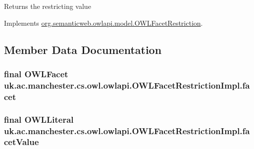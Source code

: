 \begin{DoxyReturn}{Returns}
the restricting value 
\end{DoxyReturn}


Implements \hyperlink{interfaceorg_1_1semanticweb_1_1owlapi_1_1model_1_1_o_w_l_facet_restriction_ac1eeeb10d66d4d21784a8985ec5908d9}{org.\-semanticweb.\-owlapi.\-model.\-O\-W\-L\-Facet\-Restriction}.



\subsection{Member Data Documentation}
\hypertarget{classuk_1_1ac_1_1manchester_1_1cs_1_1owl_1_1owlapi_1_1_o_w_l_facet_restriction_impl_a43b4dbe8b964fd6287e66fcb121da81c}{
\subsubsection[{facet}]{\setlength{\rightskip}{0pt plus 5cm}final {\bf O\-W\-L\-Facet} uk.\-ac.\-manchester.\-cs.\-owl.\-owlapi.\-O\-W\-L\-Facet\-Restriction\-Impl.\-facet\hspace{0.3cm}{\ttfamily [private]}}}\label{classuk_1_1ac_1_1manchester_1_1cs_1_1owl_1_1owlapi_1_1_o_w_l_facet_restriction_impl_a43b4dbe8b964fd6287e66fcb121da81c}
\hypertarget{classuk_1_1ac_1_1manchester_1_1cs_1_1owl_1_1owlapi_1_1_o_w_l_facet_restriction_impl_afebbfcf54a2932258f5860a01ca5fa3b}{
\subsubsection[{facet\-Value}]{\setlength{\rightskip}{0pt plus 5cm}final {\bf O\-W\-L\-Literal} uk.\-ac.\-manchester.\-cs.\-owl.\-owlapi.\-O\-W\-L\-Facet\-Restriction\-Impl.\-facet\-Value\hspace{0.3cm}{\ttfamily [private]}}}\label{classuk_1_1ac_1_1manchester_1_1cs_1_1owl_1_1owlapi_1_1_o_w_l_facet_restriction_impl_afebbfcf54a2932258f5860a01ca5fa3b}
